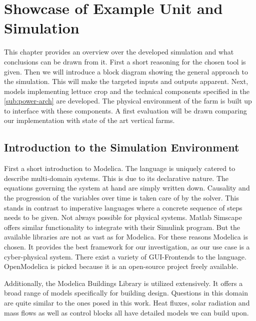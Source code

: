 \chapter{Showcase of Example Unit and Simulation}
\label{chap:simulation}
%
This chapter provides an overview over the developed simulation and what conclusions can be drawn from it.
First a short reasoning for the chosen tool is given.
Then we will introduce a block diagram showing the general approach to the simulation.
This will make the targeted inputs and outputs apparent.
Next, models implementing lettuce crop and the technical components specified in the \ref{sub:power-arch} are developed.
The physical environment of the farm is built up to interface with these components.
A first evaluation will be drawn comparing our implementation with state of the art vertical farms.

\section{Introduction to the Simulation Environment}
First a short introduction to Modelica.
The language is uniquely catered to describe multi-domain systems.
This is due to its declarative nature.
The equations governing the system at hand are simply written down.
Causality and the progression of the variables over time is taken care of by the solver.
This stands in contrast to imperative languages where a concrete sequence of steps needs to be given.
Not always possible for physical systems.
Matlab Simscape offers similar functionality to integrate with their Simulink program.
But the available libraries are not as vast as for Modelica.
For these reasons Modelica is chosen.
It provides the best framework for our investigation, as our use case is a cyber-physical system.
There exist a variety of GUI-Frontends to the language.
OpenModelica is picked because it is an open-source project freely available.

Additionally, the Modelica Buildings Library is utilized extensively.
It offers a broad range of models specifically for building design.
Questions in this domain are quite similar to the ones posed in this work.
Heat fluxes, solar radiation and mass flows as well as control blocks all have detailed models we can build upon.

